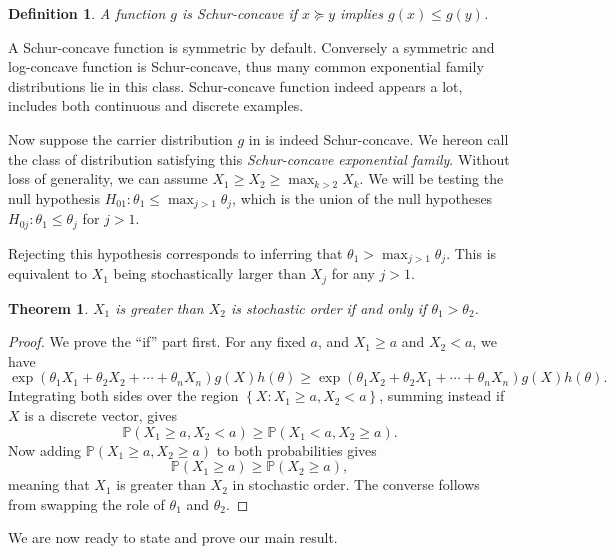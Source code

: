 \documentclass[11pt]{article}
\newtheorem{definition}{Definition}
\newtheorem{theorem}{Theorem}
\newcommand{\PP}{\mathbb{P}}
\begin{document}
\begin{definition}
A function $g$ is Schur-concave if $x \succeq y$ implies $g\left(x\right) \le g\left(y\right)$.
\end{definition}

A Schur-concave function is symmetric by default. Conversely a symmetric and log-concave function is Schur-concave, thus many common exponential family distributions lie in this class. Schur-concave function indeed appears a lot,  includes both continuous and discrete examples.

Now suppose the carrier distribution $g$ in  is indeed Schur-concave. We hereon call the class of distribution satisfying this {\em Schur-concave exponential family}. Without loss of generality, we can assume $X_1 \ge X_2 \ge \max_{k > 2} X_k$. We will be testing the null hypothesis $H_{01}: \theta_1 \le \max_{j > 1} \theta_j$, which is the union of the null hypotheses $H_{0j}: \theta_1 \le \theta_j$ for $j > 1$.

Rejecting this hypothesis corresponds to inferring that $\theta_1 > \max_{j>1} \theta_j$. This is equivalent to $X_1$ being stochastically larger than $X_j$ for any $j > 1$.

\begin{theorem}
\label{thm:stoch}
$X_1$ is greater than $X_2$ is stochastic order if and only if $\theta_1 > \theta_2$.
\end{theorem}

\begin{proof}

We prove the ``if'' part first. For any fixed $a$, and $X_1 \ge a$ and $X_2 < a$, we have
$$\exp\left(\theta_1 X_1 + \theta_2 X_2 + \cdots + \theta_n X_n\right) g\left(X\right) h\left(\theta\right) \ge \exp\left(\theta_1 X_2 + \theta_2 X_1 + \cdots + \theta_n X_n\right) g\left(X\right) h\left(\theta\right).$$
Integrating both sides over the region $\left\{X: X_1 \ge a, X_2 < a\right\}$, summing instead if $X$ is a discrete vector, gives
$$\PP\left(X_1 \ge a, X_2 < a\right) \ge \PP\left(X_1 < a, X_2 \ge a\right).$$
Now adding $\PP\left(X_1 \ge a, X_2 \ge a\right)$ to both probabilities gives
$$\PP\left(X_1 \ge a\right) \ge \PP\left(X_2 \ge a\right),$$
meaning that $X_1$ is greater than $X_2$ in stochastic order. The converse follows from swapping the role of $\theta_1$ and $\theta_2$.

\end{proof}

We are now ready to state and prove our main result.
\end{document}

